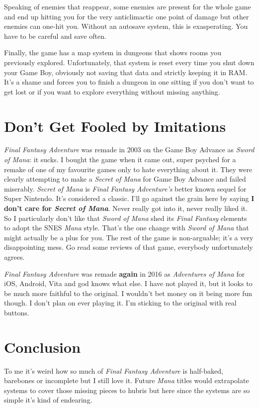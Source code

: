 \documentclass{book}
\begin{document}
Speaking of enemies that reappear, some enemies are present for the whole game and end up hitting you for the very anticlimactic one point of damage but other enemies can one-hit you. Without an autosave system, this is exasperating. You have to be careful and save often.\par
Finally, the game has a map system in dungeons that shows rooms you previously explored. Unfortunately, that system is reset every time you shut down your Game Boy, obviously not saving that data and strictly keeping it in RAM. It’s a shame and forces you to finish a dungeon in one sitting if you don’t want to get lost or if you want to explore everything without missing anything.\par
\FloatBarrier\section*{Don’t Get Fooled by Imitations}
\emph{Final Fantasy Adventure} was remade in 2003 on the Game Boy Advance as \emph{Sword of Mana}: it sucks. I bought the game when it came out, super psyched for a remake of one of my favourite games only to hate everything about it. They were clearly attempting to make a \emph{Secret of Mana} for Game Boy Advance and failed miserably. \emph{Secret of Mana} is \emph{Final Fantasy Adventure’s} better known sequel for Super Nintendo. It’s considered a classic. I’ll go against the grain here by saying \textbf{I don’t care for \emph{Secret of Mana}}. Never really got into it, never really liked it. So I particularly don’t like that \emph{Sword of Mana} shed its \emph{Final Fantasy} elements to adopt the SNES \emph{Mana} style. That’s the one change with \emph{Sword of Mana} that might actually be a plus for you. The rest of the game is non-arguable; it’s a very disappointing mess. Go read some reviews of that game, everybody unfortunately agrees.\par
\emph{Final Fantasy Adventure} was remade \textbf{again} in 2016 as \emph{Adventures of Mana} for iOS, Android, Vita and god knows what else. I have not played it, but it looks to be much more faithful to the original. I wouldn’t bet money on it being more fun though. I don’t plan on ever playing it. I’m sticking to the original with real buttons.\par
\FloatBarrier\section*{Conclusion}
To me it’s weird how so much of \emph{Final Fantasy Adventure} is half-baked, barebones or incomplete but I still love it. Future \emph{Mana} titles would extrapolate systems to cover those missing pieces to hubris but here since the systems are so simple it’s kind of endearing.\par
\end{document}
